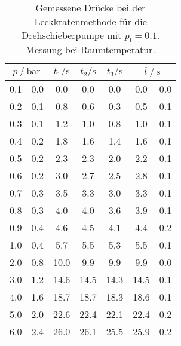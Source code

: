 \begin{table} 
\centering 
\caption{Gemessene Drücke bei der Leckkratenmethode für die Drehschieberpumpe mit $p_{\mathrm{l}}=0.1$. Messung bei Raumtemperatur.} 
\label{tab: leck_turbo_leck_0.1.pdf} 
\begin{tabular}{S[table-format=1.1]@{${}\pm{}$} S[table-format=1.1] S S S S[table-format=1.1]@{${}\pm{}$} S[table-format=1.1] } 
\toprule  
{} & {$t_1 / \si{ \second}$} & {$t_2 / \si{ \second}$} & {$t_3 / \si{ \second}$} &  \\ 
 & 0.0 & 0.0 & 0.0 & 0.0 & 0.0 & 0.0\\ 
0.2 & 0.1 & 0.8 & 0.6 & 0.3 & 0.5 & 0.1\\ 
0.3 & 0.1 & 1.2 & 1.0 & 0.8 & 1.0 & 0.1\\ 
0.4 & 0.2 & 1.8 & 1.6 & 1.4 & 1.6 & 0.1\\ 
0.5 & 0.2 & 2.3 & 2.3 & 2.0 & 2.2 & 0.1\\ 
0.6 & 0.2 & 3.0 & 2.7 & 2.5 & 2.8 & 0.1\\ 
0.7 & 0.3 & 3.5 & 3.3 & 3.0 & 3.3 & 0.1\\ 
0.8 & 0.3 & 4.0 & 4.0 & 3.6 & 3.9 & 0.1\\ 
0.9 & 0.4 & 4.6 & 4.5 & 4.1 & 4.4 & 0.2\\ 
1.0 & 0.4 & 5.7 & 5.5 & 5.3 & 5.5 & 0.1\\ 
2.0 & 0.8 & 10.0 & 9.9 & 9.9 & 9.9 & 0.0\\ 
3.0 & 1.2 & 14.6 & 14.5 & 14.3 & 14.5 & 0.1\\ 
4.0 & 1.6 & 18.7 & 18.7 & 18.3 & 18.6 & 0.1\\ 
5.0 & 2.0 & 22.6 & 22.4 & 22.1 & 22.4 & 0.2\\ 
6.0 & 2.4 & 26.0 & 26.1 & 25.5 & 25.9 & 0.2\\ 
\bottomrule 
\end{tabular} 
\end{table}
